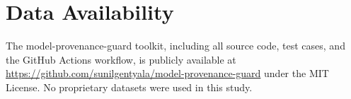 \documentclass[preprint,12pt,twocolumn]{elsarticle}
\begin{document}
\section*{Data Availability}

The model-provenance-guard toolkit, including all source code, test cases,
and the GitHub Actions workflow, is publicly available at
\url{https://github.com/sunilgentyala/model-provenance-guard} under the
MIT License. No proprietary datasets were used in this study.



\end{document}
